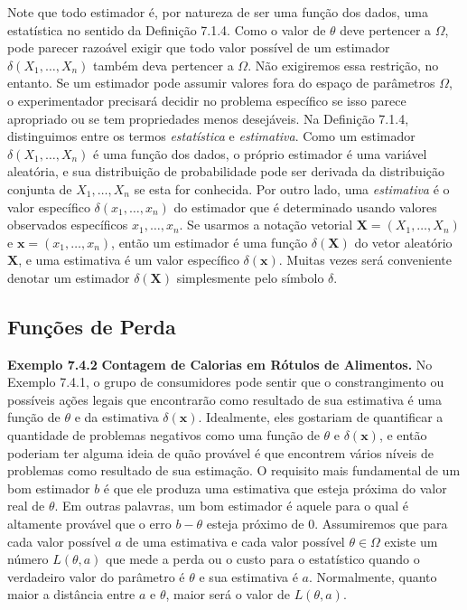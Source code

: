 \vspace{1cm}
Note que todo estimador é, por natureza de ser uma função dos dados, uma estatística no sentido da Definição 7.1.4.
Como o valor de $\theta$ deve pertencer a $\Omega$, pode parecer razoável exigir que todo valor possível de um estimador $\delta(X_1, \dots, X_n)$ também deva pertencer a $\Omega$. Não exigiremos essa restrição, no entanto. Se um estimador pode assumir valores fora do espaço de parâmetros $\Omega$, o experimentador precisará decidir no problema específico se isso parece apropriado ou se tem propriedades menos desejáveis.
Na Definição 7.1.4, distinguimos entre os termos \textit{estatística} e \textit{estimativa}. Como um estimador $\delta(X_1, \dots, X_n)$ é uma função dos dados, o próprio estimador é uma variável aleatória, e sua distribuição de probabilidade pode ser derivada da distribuição conjunta de $X_1, \dots, X_n$ se esta for conhecida. Por outro lado, uma \textit{estimativa} é o valor específico $\delta(x_1, \dots, x_n)$ do estimador que é determinado usando valores observados específicos $x_1, \dots, x_n$. Se usarmos a notação vetorial $\mathbf{X}=(X_1, \dots, X_n)$ e $\mathbf{x}=(x_1, \dots, x_n)$, então um estimador é uma função $\delta(\mathbf{X})$ do vetor aleatório $\mathbf{X}$, e uma estimativa é um valor específico $\delta(\mathbf{x})$. Muitas vezes será conveniente denotar um estimador $\delta(\mathbf{X})$ simplesmente pelo símbolo $\delta$.

\subsection*{Funções de Perda}

\noindent\textbf{Exemplo 7.4.2} \quad \textbf{Contagem de Calorias em Rótulos de Alimentos.} No Exemplo 7.4.1, o grupo de consumidores pode sentir que o constrangimento ou possíveis ações legais que encontrarão como resultado de sua estimativa é uma função de $\theta$ e da estimativa $\delta(\mathbf{x})$. Idealmente, eles gostariam de quantificar a quantidade de problemas negativos como uma função de $\theta$ e $\delta(\mathbf{x})$, e então poderiam ter alguma ideia de quão provável é que encontrem vários níveis de problemas como resultado de sua estimação. O requisito mais fundamental de um bom estimador $b$ é que ele produza uma estimativa que esteja próxima do valor real de $\theta$. Em outras palavras, um bom estimador é aquele para o qual é altamente provável que o erro $b-\theta$ esteja próximo de 0. Assumiremos que para cada valor possível $a$ de uma estimativa e cada valor possível $\theta \in \Omega$ existe um número $L(\theta, a)$ que mede a perda ou o custo para o estatístico quando o verdadeiro valor do parâmetro é $\theta$ e sua estimativa é $a$. Normalmente, quanto maior a distância entre $a$ e $\theta$, maior será o valor de $L(\theta, a)$.

